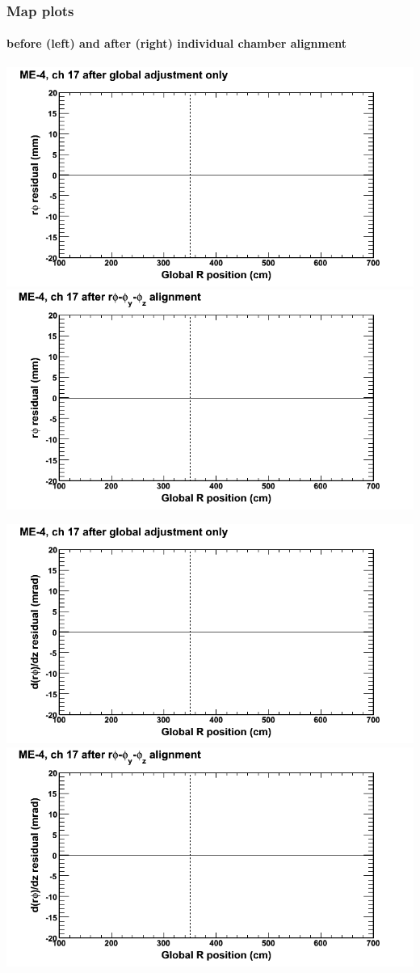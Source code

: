 \documentclass[compress]{beamer}
\begin{document}
\begin{frame}
\frametitle{Map plots}
\framesubtitle{before (left) and after (right) individual chamber alignment}
\includegraphics[width=0.5\linewidth]{ringmapplots_3dof/before_CSCvsr_mem4ch17_x.png} \includegraphics[width=0.5\linewidth]{ringmapplots_3dof/after_CSCvsr_mem4ch17_x.png}

\includegraphics[width=0.5\linewidth]{ringmapplots_3dof/before_CSCvsr_mem4ch17_dxdz.png} \includegraphics[width=0.5\linewidth]{ringmapplots_3dof/after_CSCvsr_mem4ch17_dxdz.png}
\end{frame}
\end{document}
